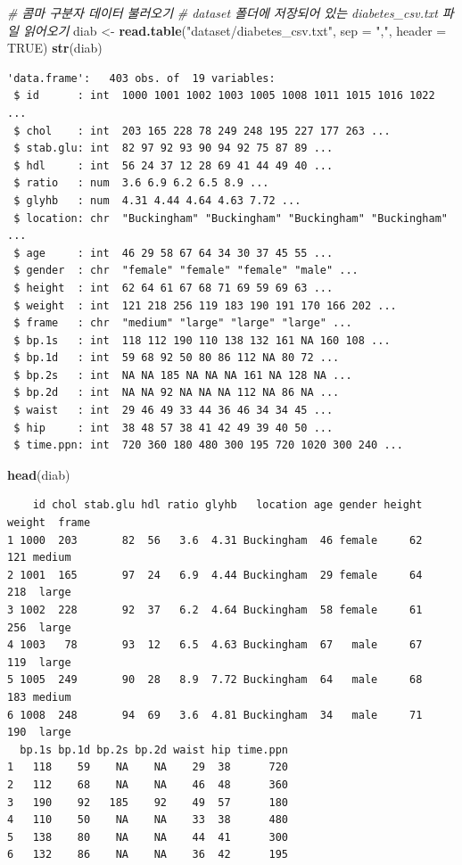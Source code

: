 \documentclass[
  11pt,
]{krantz}
\newenvironment{Shaded}{\begin{snugshade}}{\end{snugshade}}
\newcommand{\CommentTok}[1]{\textcolor[rgb]{0.37,0.37,0.37}{\textit{#1}}}
\newcommand{\DataTypeTok}[1]{\textcolor[rgb]{0.27,0.27,0.27}{#1}}
\newcommand{\KeywordTok}[1]{\textcolor[rgb]{0.27,0.27,0.27}{\textbf{#1}}}
\newcommand{\NormalTok}[1]{#1}
\newcommand{\OtherTok}[1]{\textcolor[rgb]{0.37,0.37,0.37}{#1}}
\newcommand{\StringTok}[1]{\textcolor[rgb]{0.5,0.5,0.5}{#1}}
\begin{document}
\begin{Shaded}
\begin{Highlighting}[]
\CommentTok{# 콤마 구분자 데이터 불러오기}
\CommentTok{# dataset 폴더에 저장되어 있는 diabetes_csv.txt 파일 읽어오기}
\NormalTok{diab <-}\StringTok{ }\KeywordTok{read.table}\NormalTok{(}\StringTok{"dataset/diabetes_csv.txt"}\NormalTok{, }\DataTypeTok{sep =} \StringTok{","}\NormalTok{, }\DataTypeTok{header =} \OtherTok{TRUE}\NormalTok{)}
\KeywordTok{str}\NormalTok{(diab)}
\end{Highlighting}
\end{Shaded}

\begin{verbatim}
'data.frame':   403 obs. of  19 variables:
 $ id      : int  1000 1001 1002 1003 1005 1008 1011 1015 1016 1022 ...
 $ chol    : int  203 165 228 78 249 248 195 227 177 263 ...
 $ stab.glu: int  82 97 92 93 90 94 92 75 87 89 ...
 $ hdl     : int  56 24 37 12 28 69 41 44 49 40 ...
 $ ratio   : num  3.6 6.9 6.2 6.5 8.9 ...
 $ glyhb   : num  4.31 4.44 4.64 4.63 7.72 ...
 $ location: chr  "Buckingham" "Buckingham" "Buckingham" "Buckingham" ...
 $ age     : int  46 29 58 67 64 34 30 37 45 55 ...
 $ gender  : chr  "female" "female" "female" "male" ...
 $ height  : int  62 64 61 67 68 71 69 59 69 63 ...
 $ weight  : int  121 218 256 119 183 190 191 170 166 202 ...
 $ frame   : chr  "medium" "large" "large" "large" ...
 $ bp.1s   : int  118 112 190 110 138 132 161 NA 160 108 ...
 $ bp.1d   : int  59 68 92 50 80 86 112 NA 80 72 ...
 $ bp.2s   : int  NA NA 185 NA NA NA 161 NA 128 NA ...
 $ bp.2d   : int  NA NA 92 NA NA NA 112 NA 86 NA ...
 $ waist   : int  29 46 49 33 44 36 46 34 34 45 ...
 $ hip     : int  38 48 57 38 41 42 49 39 40 50 ...
 $ time.ppn: int  720 360 180 480 300 195 720 1020 300 240 ...
\end{verbatim}

\begin{Shaded}
\begin{Highlighting}[]
\KeywordTok{head}\NormalTok{(diab)}
\end{Highlighting}
\end{Shaded}

\begin{verbatim}
    id chol stab.glu hdl ratio glyhb   location age gender height weight  frame
1 1000  203       82  56   3.6  4.31 Buckingham  46 female     62    121 medium
2 1001  165       97  24   6.9  4.44 Buckingham  29 female     64    218  large
3 1002  228       92  37   6.2  4.64 Buckingham  58 female     61    256  large
4 1003   78       93  12   6.5  4.63 Buckingham  67   male     67    119  large
5 1005  249       90  28   8.9  7.72 Buckingham  64   male     68    183 medium
6 1008  248       94  69   3.6  4.81 Buckingham  34   male     71    190  large
  bp.1s bp.1d bp.2s bp.2d waist hip time.ppn
1   118    59    NA    NA    29  38      720
2   112    68    NA    NA    46  48      360
3   190    92   185    92    49  57      180
4   110    50    NA    NA    33  38      480
5   138    80    NA    NA    44  41      300
6   132    86    NA    NA    36  42      195
\end{verbatim}
\end{document}
